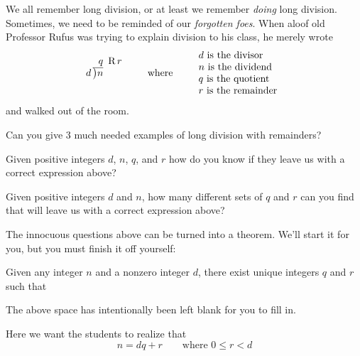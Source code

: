 We all remember long division, or at least we
remember \textit{doing} long division. Sometimes, we need to be
reminded of our \textit{forgotten foes}. When
aloof old Professor Rufus was trying to explain division to his class,
he merely wrote
\[
d\,\begin{tabular}[b]{@{}r@{} r}
$q$ &\, R\,$r$\\ \cline{1-1}
\big)\begin{tabular}[t]{@{}l@{}}
$n$ 
\end{tabular}
\end{tabular}
\qquad\text{where}\qquad
\begin{tabular}{l}
$d$ is the divisor \\ \index{divisor}
$n$ is the dividend \\ \index{dividend}
$q$ is the quotient \\ \index{quotient}
$r$ is the remainder \index{remainder}
\end{tabular}
\]
and walked out of the room.

\begin{question} 
Can you give $3$ much needed examples of long division with
remainders?
\end{question}
\QM

\begin{question} 
Given positive integers $d$, $n$, $q$, and $r$ how do you know if they
leave us with a correct expression above?
\end{question}
\QM

\begin{question} 
Given positive integers $d$ and $n$, how many different sets of $q$
and $r$ can you find that will leave us with a correct expression
above?
\end{question}
\QM


The innocuous questions above can be turned into a theorem. We'll start
it for you, but you must finish it off yourself:

\begin{theorem}
Given any integer $n$ and a nonzero integer $d$, there exist unique
integers $q$ and $r$ such that
\vspace{1in}
\end{theorem}
\noindent The above space has intentionally been left blank for you to
fill in.


\begin{teachingnote}
Here we want the students to realize that
\[
n = dq + r\qquad\text{where } 0 \le r < d 
\]
\end{teachingnote}


